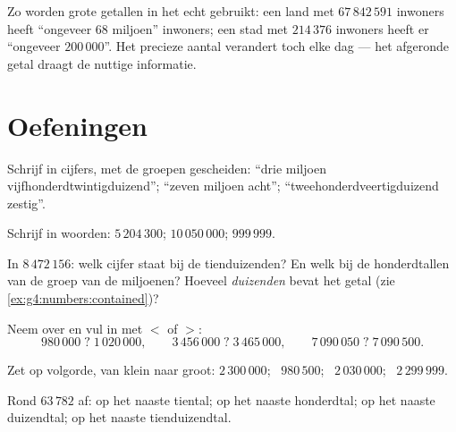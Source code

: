 \begin{example}\label{ex:g4:numbers:world}
Zo worden grote getallen in het echt gebruikt: een land met
$67\,842\,591$ inwoners heeft ``ongeveer $68$ miljoen'' inwoners; een
stad met $214\,376$ inwoners heeft er ``ongeveer $200\,000$''. Het
precieze aantal verandert toch elke dag --- het afgeronde getal draagt de
nuttige informatie.
\end{example}

\section{Oefeningen}

\begin{exercise}[$\star$]\label{exo:g4:numbers:1}
Schrijf in cijfers, met de groepen gescheiden: ``drie miljoen
vijfhonderdtwintigduizend''; ``zeven miljoen acht'';
``tweehonderdveertigduizend zestig''.
\end{exercise}

\begin{exercise}[$\star$]\label{exo:g4:numbers:2}
Schrijf in woorden: $5\,204\,300$; \quad $10\,050\,000$; \quad
$999\,999$.
\end{exercise}

\begin{exercise}[$\star$]\label{exo:g4:numbers:3}
In $8\,472\,156$: welk cijfer staat bij de tienduizenden? En welk bij de
honderdtallen van de groep van de miljoenen? Hoeveel \emph{duizenden}
bevat het getal (zie \cref{ex:g4:numbers:contained})?
\end{exercise}

\begin{exercise}[$\star$]\label{exo:g4:numbers:4}
Neem over en vul in met $<$ of $>$:
\[
980\,000 \;?\; 1\,020\,000, \qquad
3\,456\,000 \;?\; 3\,465\,000, \qquad
7\,090\,050 \;?\; 7\,090\,500 .
\]
\end{exercise}

\begin{exercise}[$\star$]\label{exo:g4:numbers:5}
Zet op volgorde, van klein naar groot: $2\,300\,000$; \ $980\,500$; \
$2\,030\,000$; \ $2\,299\,999$.
\end{exercise}

\begin{exercise}[$\star$]\label{exo:g4:numbers:6}
Rond $63\,782$ af: op het naaste tiental; op het naaste honderdtal; op
het naaste duizendtal; op het naaste tienduizendtal.
\end{exercise}

